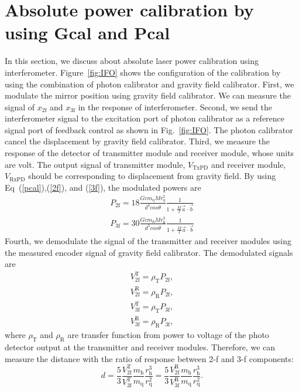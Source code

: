\documentclass[%
 reprint,
superscriptaddress,
 amsmath,amssymb,
 aps,
]{revtex4-1}
\begin{document}
\section{Absolute power calibration by using Gcal and Pcal} \label{sec:PGCAL}
In this section, we discuss about absolute laser power calibration using interferometer. 
Figure~\ref{fig:IFO} shows the configuration of the calibration by using the combination of photon calibrator and gravity field calibrator.
First, we modulate the mirror position using gravity field calibrator. We can measure the signal of $x_{\mathrm{2f}}$ and $x_{\mathrm{3f}}$ in the response of interferometer. Second, we send the interferometer signal to the excitation port of photon calibrator as a reference signal port of feedback control as shown in Fig.~\ref{fig:IFO}. The photon calibrator cancel the displacement by gravity field calibrator. Third, we measure the response of the detector of transmitter module and receiver module, whose units are volt. The output signal of transmitter module, $V_{\mathrm{TxPD}}$ and receiver module, $V_{\mathrm{RxPD}}$ should be corresponding to displacement from gravity field. By using Eq~(\ref{pcal}),(\ref{2f}), and (\ref{3f}), the modulated powers are
\begin{eqnarray}
 P_{\mathrm{2f}}=18 \frac{Gcm_{\mathrm{q}}Mr_{\mathrm{q}}^2}{d^4cos\theta}\frac{1}{1+\frac{M}{I}\vec{a}\cdot \vec{b}} \label{P2f} \\
 P_{\mathrm{3f}}= 30\frac{Gcm_{\mathrm{h}}Mr_{\mathrm{h}}^3}{d^5cos\theta}\frac{1}{1+\frac{M}{I}\vec{a}\cdot \vec{b}} \label{P3f}
\end{eqnarray}
Fourth, we demodulate the signal of the transmitter and receiver modules using the measured encoder signal of gravity field calibrator.
The demodulated signals are 
\begin{eqnarray}
V_{\mathrm{2f}}^{\mathrm{T}}=\rho_{\mathrm{T}}P_{\mathrm{2f}}, \\
V_{\mathrm{2f}}^{\mathrm{R}}=\rho_{\mathrm{R}}P_{\mathrm{2f}}, \\
V_{\mathrm{3f}}^{\mathrm{T}}=\rho_{\mathrm{T}}P_{\mathrm{3f}}, \\
V_{\mathrm{3f}}^{\mathrm{R}}=\rho_{\mathrm{R}}P_{\mathrm{3f}}, 
\end{eqnarray} 
where $\rho_{\mathrm{T}}$ and $\rho_{\mathrm{R}}$ are transfer function from power to voltage of the photo detector output at the transmitter and receiver modules.
Therefore, we can measure the distance with the ratio of response between 2-f and 3-f components: 
\begin{equation}
d=\frac{5}{3} \frac{V_{\mathrm{2f}}^{\mathrm{T}}}{V_{\mathrm{3f}}^{\mathrm{T}}}\frac{m_{\mathrm{h}}}{m_{\mathrm{q}}}\frac{r_{\mathrm{h}}^{3}}{r_{\mathrm{q}}^{2}}=\frac{5}{3} \frac{V_{\mathrm{2f}}^{\mathrm{R}}}{V_{\mathrm{3f}}^{\mathrm{R}}} \frac{m_{\mathrm{h}}}{m_{\mathrm{q}}}\frac{r_{\mathrm{h}}^{3}}{r_{\mathrm{q}}^{2}}. \label{d}
\end{equation}
\end{document}
